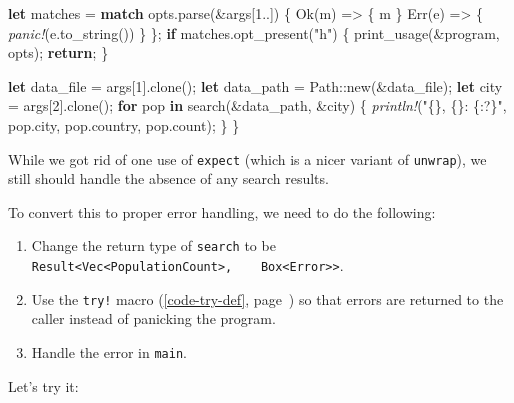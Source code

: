\documentclass[a4paper,]{book}
\renewcommand*{\hyperref}[2][\ar]{%
  \def\ar{#2}%
  #2 (\autoref{#1}, page~\pageref{#1})}
\newenvironment{Shaded}{\begin{snugshade}}{\end{snugshade}}
\newcommand{\KeywordTok}[1]{\textcolor[rgb]{0.13,0.29,0.53}{\textbf{{#1}}}}
\newcommand{\DecValTok}[1]{\textcolor[rgb]{0.00,0.00,0.81}{{#1}}}
\newcommand{\ConstantTok}[1]{\textcolor[rgb]{0.00,0.00,0.00}{{#1}}}
\newcommand{\StringTok}[1]{\textcolor[rgb]{0.31,0.60,0.02}{{#1}}}
\newcommand{\PreprocessorTok}[1]{\textcolor[rgb]{0.56,0.35,0.01}{\textit{{#1}}}}
\newcommand{\NormalTok}[1]{{#1}}
\providecommand{\tightlist}{%
  \setlength{\itemsep}{0pt}\setlength{\parskip}{0pt}}
\begin{document}
\begin{Shaded}
\begin{Highlighting}[]
    \KeywordTok{let} \NormalTok{matches = }\KeywordTok{match} \NormalTok{opts.parse(&args[}\DecValTok{1.}\NormalTok{.]) \{}
        \ConstantTok{Ok}\NormalTok{(m)  => \{ m \}}
        \ConstantTok{Err}\NormalTok{(e) => \{ }\PreprocessorTok{panic!}\NormalTok{(e.to_string()) \}}
    \NormalTok{\};}
    \KeywordTok{if} \NormalTok{matches.opt_present(}\StringTok{"h"}\NormalTok{) \{}
        \NormalTok{print_usage(&program, opts);}
        \KeywordTok{return}\NormalTok{;}
    \NormalTok{\}}
        
    \KeywordTok{let} \NormalTok{data_file = args[}\DecValTok{1}\NormalTok{].clone();}
    \KeywordTok{let} \NormalTok{data_path = Path::new(&data_file);}
    \KeywordTok{let} \NormalTok{city = args[}\DecValTok{2}\NormalTok{].clone();}
    \KeywordTok{for} \NormalTok{pop }\KeywordTok{in} \NormalTok{search(&data_path, &city) \{}
        \PreprocessorTok{println!}\NormalTok{(}\StringTok{"\{\}, \{\}: \{:?\}"}\NormalTok{, pop.city, pop.country, pop.count);}
    \NormalTok{\}}
\NormalTok{\}}
\end{Highlighting}
\end{Shaded}

While we got rid of one use of \texttt{expect} (which is a nicer variant
of \texttt{unwrap}), we still should handle the absence of any search
results.

To convert this to proper error handling, we need to do the following:

\begin{enumerate}
\def\labelenumi{\arabic{enumi}.}
\tightlist
\item
  Change the return type of \texttt{search} to be
  \texttt{Result\textless{}Vec\textless{}PopulationCount\textgreater{},\ \ \ \ Box\textless{}Error\textgreater{}\textgreater{}}.
\item
  Use the \hyperref[code-try-def]{\texttt{try!} macro} so that errors
  are returned to the caller instead of panicking the program.
\item
  Handle the error in \texttt{main}.
\end{enumerate}

Let's try it:
\end{document}
